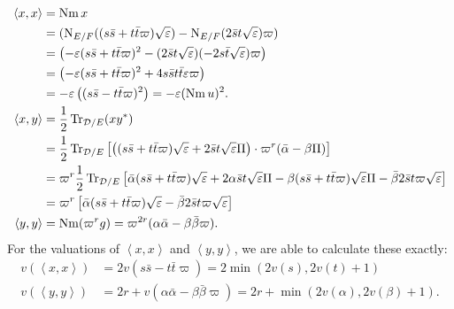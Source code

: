 \begin{align*}
  \left\langle x,x \right\rangle &= \operatorname{Nm} x \\
  &= (\operatorname{N}_{E/F}((s \bar s + t \bar t \varpi)\sqrt{\varepsilon})
    - \operatorname{N}_{E/F}(2 \bar s t \sqrt{\varepsilon}) \varpi) \\
  &= \left( -\varepsilon(s \bar s + t \bar t \varpi)^2
    - (2\bar s t \sqrt{\varepsilon})(-2s \bar t \sqrt{\varepsilon}) \varpi \right) \\
  &= \left( -\varepsilon(s \bar s + t \bar t \varpi)^2
    + 4s\bar s t \bar t \varepsilon \varpi \right) \\
  &= -\varepsilon\left( (s \bar s - t \bar t \varpi)^2 \right) = -\varepsilon (\operatorname{Nm} u)^2. \\
  \left\langle x,y \right\rangle &= \frac{1}{2} \operatorname{Tr}_{\mathcal D/E} (x y^\ast) \\
  &= \frac{1}{2} \operatorname{Tr}_{\mathcal D/E} \left[
    \left( (s \bar s + t \bar t \varpi) \sqrt{\varepsilon} + 2 \bar s t \sqrt{\varepsilon} \Pi \right)
    \cdot \varpi^{r} (\bar\alpha - \beta \Pi)
  \right] \\
  &= \varpi^r \frac{1}{2} \operatorname{Tr}_{\mathcal D/E} \left[
    \bar\alpha (s \bar s + t \bar t \varpi) \sqrt{\varepsilon}
    + 2 \alpha \bar s t \sqrt{\varepsilon} \Pi
    - \beta (s \bar s + t \bar t \varpi) \sqrt{\varepsilon} \Pi
    - \bar\beta 2 \bar s t \varpi \sqrt{\varepsilon}
  \right] \\
  &= \varpi^r \left[
    \bar\alpha (s \bar s + t \bar t \varpi) \sqrt{\varepsilon}
    - \bar\beta 2 \bar s t \varpi \sqrt{\varepsilon} \right] \\
  \left\langle y,y \right\rangle &= \operatorname{Nm} (\varpi^r g)
  = \varpi^{2r} (\alpha \bar\alpha - \beta\bar\beta \varpi).
\end{align*}
For the valuations of $\left\langle x,x \right\rangle$ and $\left\langle y,y \right\rangle$,
we are able to calculate these exactly:
\begin{align*}
  v(\left\langle x,x \right\rangle)
  &= 2v\left( s \bar s - t \bar t \varpi \right)
  = 2\min\left( 2v(s), 2v(t) +1 \right) \\
  v\left( \left\langle y,y \right\rangle \right)
  &= 2r + v\left( \alpha \bar \alpha - \beta \bar \beta \varpi \right)
  = 2r + \min\left( 2v(\alpha), 2v(\beta) + 1 \right).
\end{align*}

